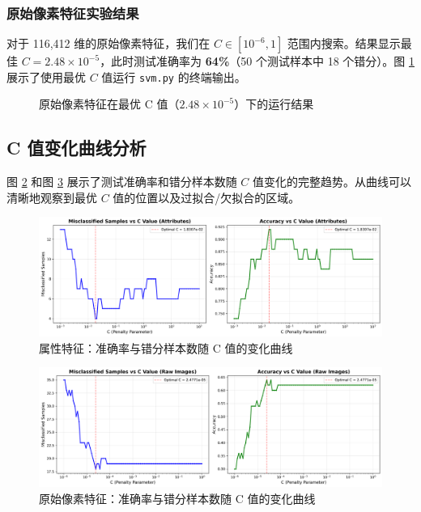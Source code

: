 \documentclass[UTF8]{ctexart}
\begin{document}
\subsubsection{原始像素特征实验结果}

对于 116,412 维的原始像素特征，我们在 $C \in [10^{-6}, 1]$ 范围内搜索。结果显示最佳 $C = 2.48 \times 10^{-5}$，此时测试准确率为 \textbf{64\%}（50 个测试样本中 18 个错分）。图 \ref{fig:terminal_images} 展示了使用最优 $C$ 值运行 \texttt{svm.py} 的终端输出。

\begin{figure}[H]
    \centering
    \caption{原始像素特征在最优 C 值（$2.48 \times 10^{-5}$）下的运行结果}
    \label{fig:terminal_images}
\end{figure}

\subsection{C 值变化曲线分析}

图 \ref{fig:c_attrs} 和图 \ref{fig:c_images} 展示了测试准确率和错分样本数随 $C$ 值变化的完整趋势。从曲线可以清晰地观察到最优 $C$ 值的位置以及过拟合/欠拟合的区域。

\begin{figure}[H]
    \centering
    \includegraphics[width=\textwidth]{../log/c_value_curves_attrs.png}
    \caption{属性特征：准确率与错分样本数随 C 值的变化曲线}
    \label{fig:c_attrs}
\end{figure}

\begin{figure}[H]
    \centering
    \includegraphics[width=\textwidth]{../log/c_value_curves_images.png}
    \caption{原始像素特征：准确率与错分样本数随 C 值的变化曲线}
    \label{fig:c_images}
\end{figure}
\end{document}
